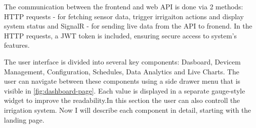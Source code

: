 The communication between the frontend and web API is done via 2 methods: HTTP requests - for fetching sensor data, trigger
irrigaiton actions and display system status and SignalR - for sending live data from the API to fronend. In the HTTP requests,
a JWT token is included, ensuring secure access to system's features.

The user interface is divided into several key components: Dasboard, Devicem Management, Configuration, Schedules, Data Analytics and Live Charts.
The user can navigate between these components using a side drawer menu that is visible in \ref{fig:dashboard-page}. 
Each value is displayed in a separate gauge-style widget to improve the readability.In this section the user can also controll the irrigation system.
Now I will describe each component in detail, starting with the landing page.

